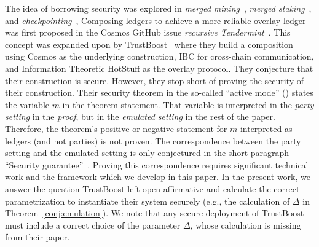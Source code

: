The idea of borrowing security was explored in \emph{merged mining}~\cite{namecoin},
\emph{merged staking}~\cite{pos-sidechains}, and
\emph{checkpointing}~\cite{karakostas2021securing},
Composing ledgers to achieve a more reliable overlay ledger
was first proposed in the Cosmos GitHub issue
\emph{recursive Tendermint}~\cite{recursive-tendermint}.
This concept was expanded upon by TrustBoost~\cite{trustboost}
where they build a composition using Cosmos as the underlying
construction, IBC for cross-chain communication, and Information Theoretic
HotStuff as the overlay protocol. They conjecture that their construction
is secure. However, they stop short of proving the security of their construction.
Their security theorem in the so-called ``active mode'' (\cite[Theorem 2]{trustboost})
states the variable $m$ in the theorem statement. That variable is
interpreted in the \emph{party setting} in the \emph{proof}, but in the \emph{emulated setting}
in the rest of the paper. Therefore, the theorem's positive or negative statement
for $m$ interpreted as ledgers (and not parties) is not proven.
The correspondence between the party setting and the emulated setting is
only conjectured in the short paragraph ``Security guarantee''~\cite[Section 4.1]{trustboost}.
Proving this correspondence requires significant technical work and the framework
which we develop in this paper.
In the present work, we
answer the question TrustBoost left open affirmative and calculate the correct
parametrization to instantiate their system securely (e.g., the calculation
of $\Delta$ in Theorem~\ref{conj:emulation}). We note that any secure
deployment of TrustBoost must include a correct choice of the parameter $\Delta$,
whose calculation is missing from their paper.
